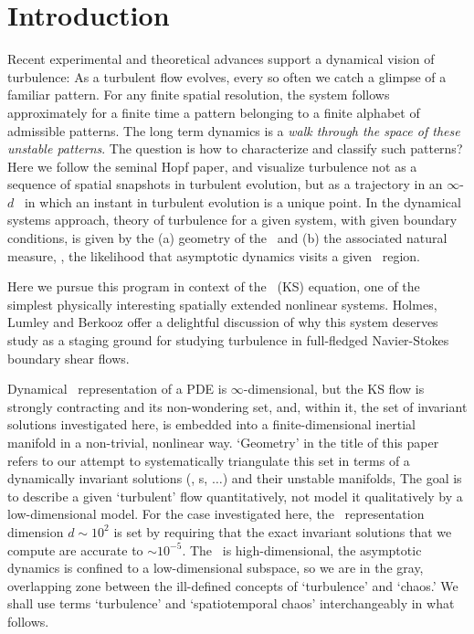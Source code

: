 

\section{Introduction}

Recent experimental and theoretical advances
support a dynamical vision of turbulence:
As a turbulent flow evolves,
every so often we catch a glimpse of a familiar pattern.
For any finite  spatial resolution,
the system follows approximately for a finite time
a pattern belonging to a
{ finite alphabet}
of admissible patterns.
The long term dynamics is
a {\em walk through the space of these unstable patterns}.
The question is how to characterize and classify such patterns?
Here we follow the seminal Hopf paper, and  visualize
turbulence not as  a sequence of
spatial snapshots in turbulent evolution,
but as a trajectory in an
 $\infty$-$d$ \statesp\ in which an
instant in turbulent evolution is
a {unique} point. In the dynamical systems approach,
theory of turbulence for a given system, with given boundary conditions,
is given by the
(a) geometry of the \statesp\ and (b) the associated natural measure,
\ie,
the likelihood that asymptotic dynamics visits a given \statesp\ region.

Here we pursue this program in context of the \KS\ (KS) equation, %
one of the simplest physically interesting spatially extended
nonlinear systems.  Holmes, Lumley and Berkooz offer a
delightful discussion of why this system deserves study as a staging
ground for studying turbulence in full-fledged Navier-Stokes
boundary shear flows.

Dynamical \statesp\ representation of a PDE is $\infty$-dimensional,
but the KS flow is strongly contracting and its non-wondering set,
and, within it, the set of invariant solutions investigated here, is
embedded into a finite-dimensional inertial manifold in
a non-trivial, nonlinear way. `Geometry' in the title of this paper
refers to our attempt to systematically triangulate this set in
terms of a dynamically invariant solutions (\eqva, \po s, $\ldots$)
and their unstable manifolds,  The goal is to describe a given
`turbulent' flow quantitatively, not model it qualitatively by a
low-dimensional model. For the case investigated here, the \statesp\
representation dimension $d \sim 10^2$ is set by requiring that the
exact invariant solutions that we compute are accurate to $\sim
10^{-5}$.
The \statesp\ is high-dimensional, the asymptotic dynamics is
confined to a low-dimensional subspace, so we are in the gray,
overlapping zone between the ill-defined concepts of `turbulence'
and `chaos.' We shall use terms `turbulence' and `spatiotemporal
chaos' interchangeably in what follows.

